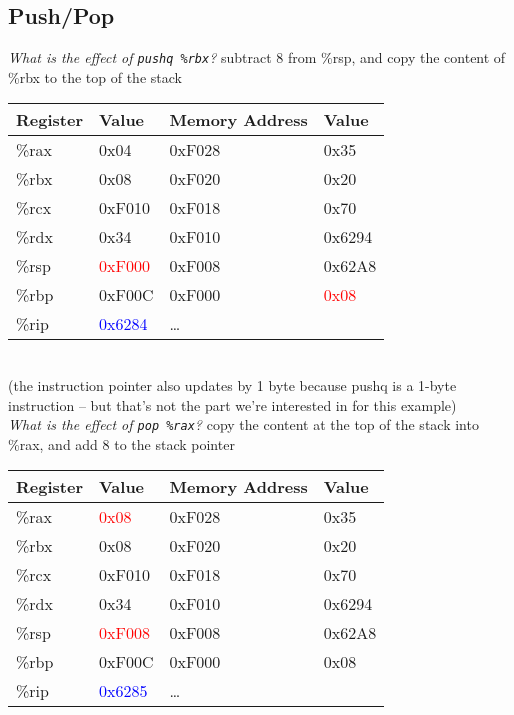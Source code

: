 \documentclass{article}
\begin{document}
\subsection{Push/Pop}

\textit{What is the effect of \texttt{pushq \%rbx}?} subtract 8 from \%rsp, and copy the content of \%rbx to the top of the stack \\
\begin{tabular}{|l|l||l|l|} \hline
Register & Value & Memory Address & Value \\ \hline
\%rax & 0x04   & 0xF028 & 0x35   \\ \hline
\%rbx & 0x08   & 0xF020 & 0x20   \\ \hline
\%rcx & 0xF010 & 0xF018 & 0x70   \\ \hline
\%rdx & 0x34   & 0xF010 & 0x6294 \\ \hline
\%rsp & \textcolor{red}{0xF000} & 0xF008 & 0x62A8 \\ \hline
\%rbp & 0xF00C & 0xF000 & \textcolor{red}{0x08}   \\ \hline
\%rip & \textcolor{blue}{0x6284} & \dots  &        \\ \hline
\end{tabular} \\
(the instruction pointer also updates by 1 byte because pushq is a 1-byte instruction -- but that's not the part we're interested in for this example) \\

\textit{What is the effect of \texttt{pop \%rax}?} copy the content at the top of the stack into \%rax, and add 8 to the stack pointer \\
\begin{tabular}{|l|l||l|l|} \hline
Register & Value & Memory Address & Value \\ \hline
\%rax & \textcolor{red}{0x08}   & 0xF028 & 0x35   \\ \hline
\%rbx & 0x08   & 0xF020 & 0x20   \\ \hline
\%rcx & 0xF010 & 0xF018 & 0x70   \\ \hline
\%rdx & 0x34   & 0xF010 & 0x6294 \\ \hline
\%rsp & \textcolor{red}{0xF008} & 0xF008 & 0x62A8 \\ \hline
\%rbp & 0xF00C & 0xF000 & 0x08   \\ \hline
\%rip & \textcolor{blue}{0x6285} & \dots  &        \\ \hline
\end{tabular} \\
\end{document}
